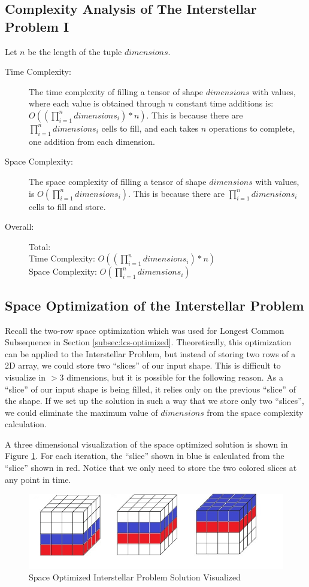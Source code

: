 \subsection{Complexity Analysis of The Interstellar Problem I}
Let $n$ be the length of the tuple $dimensions$.
\begin{description}
    \item[Time Complexity:]
        The time complexity of filling a tensor of shape $dimensions$ with values,
        where each value is obtained through $n$ constant time additions is:\\$O((\prod_{i=1}^{n} dimensions_i) * n)$. This is because there are $\prod_{i=1}^{n} dimensions_i$ cells to fill, and each takes $n$ operations to complete, one addition from each dimension.
        
    \item[Space Complexity:] 
    The space complexity of filling a tensor of shape $dimensions$ with values,
    is $O(\prod_{i=1}^{n} dimensions_i)$.
    This is because there are $\prod_{i=1}^{n} dimensions_i$ cells to fill and store.
    
    \item[Overall:] Total:\\
        Time Complexity: $O((\prod_{i=1}^{n} dimensions_i) * n)$\\
        Space Complexity: $O(\prod_{i=1}^{n} dimensions_i)$

\end{description}

\subsection{Space Optimization of the Interstellar Problem}
Recall the two-row space optimization which was used for Longest Common Subsequence in Section \ref{subsec:lcs-optimized}.
Theoretically, this optimization can be applied to the Interstellar Problem, but instead of storing two rows of a 2D array,
we could store two ``slices'' of our input shape.
This is difficult to visualize in $>3$ dimensions, but it is possible for the following reason. As a ``slice'' of our input shape is being filled, it relies only on the previous ``slice'' of the shape.
If we set up the solution in such a way that we store only two ``slices'', we could eliminate the maximum value of $dimensions$ from the space complexity calculation.

A three dimensional visualization of the space optimized solution is shown in Figure \ref{fig:interstellar-optimization}.
For each iteration, the ``slice'' shown in blue is calculated from the ``slice'' shown in red. Notice that we only need to store the two colored slices at any point in time.

\begin{figure}[H]
    \centering
    \includegraphics[width=0.8\linewidth]{visualization.jpg}
    \caption{Space Optimized Interstellar Problem Solution Visualized}
    \label{fig:interstellar-optimization}
\end{figure}